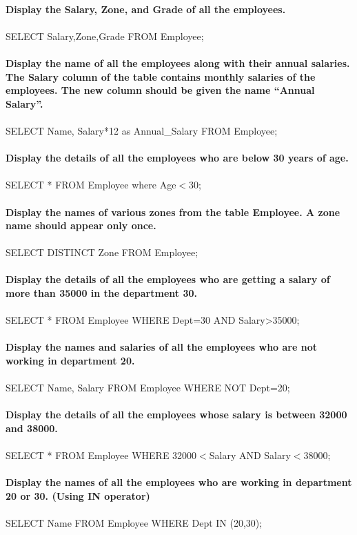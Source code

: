 \documentclass[
a4paper]{article}
\begin{document}
\begin{large}
 \\
 \textbf{Display the Salary, Zone, and Grade of all the employees.\\}\\
 SELECT Salary,Zone,Grade FROM Employee;\\
 \\
\textbf{Display the name of all the employees along with their annual salaries. The Salary column of the table contains monthly salaries of the employees. The new column should be given the name “Annual Salary”.}\\
\\
SELECT Name, Salary*12 as Annual\_Salary FROM Employee;\\
\\
\textbf{Display the details of all the employees who are below 30 years of age. }\\
		\\
  SELECT * FROM Employee where Age$<$30;\\
  \\
  \textbf{Display the names of various zones from the table Employee. A zone name should appear only once.}\\
\\
SELECT DISTINCT Zone FROM Employee;\\
\\
\textbf{Display the details of all the employees who are getting a salary of more than 35000 in the department 30.}\\
\\
SELECT * FROM Employee WHERE Dept=30 AND Salary>35000;\\
\\
\textbf{Display the names and salaries of all the employees who are not working in department 20.}\\
\\
SELECT Name, Salary FROM Employee WHERE NOT Dept=20;\\
\\
\textbf{Display the details of all the employees whose salary is between 32000 and 38000.}\\
\\
SELECT * FROM Employee WHERE  32000$<$Salary AND Salary$<$38000;\\
\\
\textbf{Display the names of all the employees who are working in department 20 or 30. (Using IN operator)}\\
\\
SELECT Name FROM Employee WHERE Dept IN (20,30);\\

\end{large}
\end{document}
